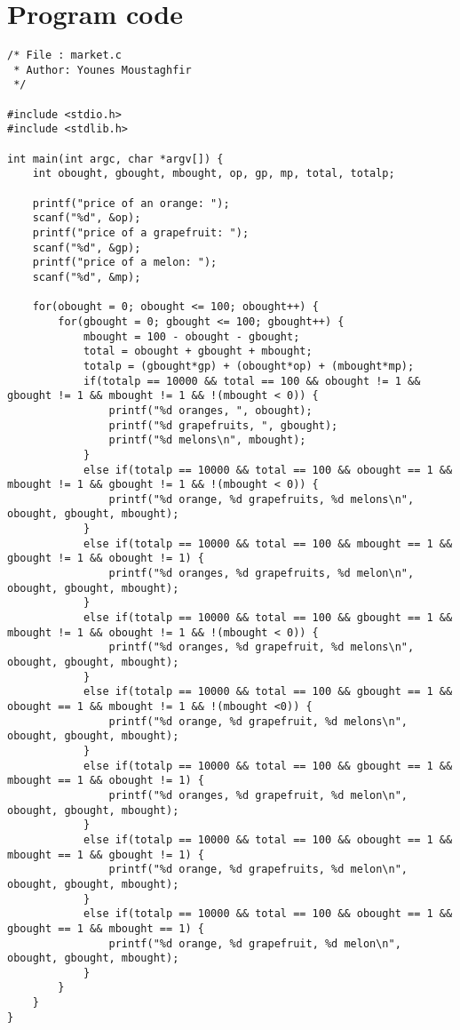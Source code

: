\documentclass[a4paper,10pt]{article}
\begin{document}
\section{Program code}
\begin{lstlisting}[style = code, title = market.c]
/* File : market.c
 * Author: Younes Moustaghfir
 */

#include <stdio.h>
#include <stdlib.h>

int main(int argc, char *argv[]) {
	int obought, gbought, mbought, op, gp, mp, total, totalp;
	
	printf("price of an orange: ");
	scanf("%d", &op);
	printf("price of a grapefruit: ");
	scanf("%d", &gp);
	printf("price of a melon: ");
	scanf("%d", &mp);
	
	for(obought = 0; obought <= 100; obought++) {
		for(gbought = 0; gbought <= 100; gbought++) {
			mbought = 100 - obought - gbought;
			total = obought + gbought + mbought;
			totalp = (gbought*gp) + (obought*op) + (mbought*mp);
			if(totalp == 10000 && total == 100 && obought != 1 && gbought != 1 && mbought != 1 && !(mbought < 0)) {
				printf("%d oranges, ", obought);
				printf("%d grapefruits, ", gbought);
				printf("%d melons\n", mbought);
			}
			else if(totalp == 10000 && total == 100 && obought == 1 && mbought != 1 && gbought != 1 && !(mbought < 0)) {
				printf("%d orange, %d grapefruits, %d melons\n", obought, gbought, mbought); 
			}
			else if(totalp == 10000 && total == 100 && mbought == 1 && gbought != 1 && obought != 1) {
				printf("%d oranges, %d grapefruits, %d melon\n", obought, gbought, mbought);
			}
			else if(totalp == 10000 && total == 100 && gbought == 1 && mbought != 1 && obought != 1 && !(mbought < 0)) {
				printf("%d oranges, %d grapefruit, %d melons\n", obought, gbought, mbought);
			}
			else if(totalp == 10000 && total == 100 && gbought == 1 && obought == 1 && mbought != 1 && !(mbought <0)) {
				printf("%d orange, %d grapefruit, %d melons\n", obought, gbought, mbought);
			}
			else if(totalp == 10000 && total == 100 && gbought == 1 && mbought == 1 && obought != 1) {
				printf("%d oranges, %d grapefruit, %d melon\n", obought, gbought, mbought);
			}
			else if(totalp == 10000 && total == 100 && obought == 1 && mbought == 1 && gbought != 1) {
				printf("%d orange, %d grapefruits, %d melon\n", obought, gbought, mbought);
			}
			else if(totalp == 10000 && total == 100 && obought == 1 && gbought == 1 && mbought == 1) {
				printf("%d orange, %d grapefruit, %d melon\n", obought, gbought, mbought);
			}
		}
	}
}
\end{lstlisting}
\end{document}
